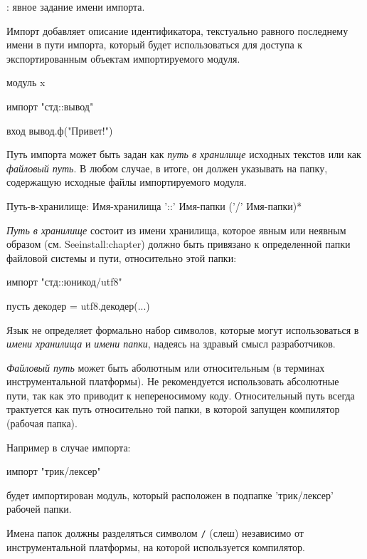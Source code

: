 \TBD: явное задание имени импорта.

\bigskip
Импорт добавляет описание идентификатора, текстуально равного последнему имени в пути импорта, который будет использоваться для доступа к экспортированным объектам импортируемого модуля. 

\begin{Trivil}
модуль x

импорт "стд::вывод"

вход {
    вывод.ф("Привет!")
}
\end{Trivil}

Путь импорта может быть задан как \emph{путь в хранилище} исходных текстов или как \emph{файловый путь}. 
В любом случае, в итоге, он должен указывать на папку, содержащую исходные файлы импортируемого модуля.

\begin{Grammar}[vspace=2pt]
Путь-в-хранилище: 
    Имя-хранилища '::' Имя-папки ('/' Имя-папки)*
\end{Grammar} 

\emph{Путь в хранилище} состоит из имени хранилища, которое явным или неявным образом (см. See{install:chapter}) должно быть привязано к определенной папки файловой системы и пути, относительно этой папки:
\begin{Trivil}[vspace=2pt]
импорт "стд::юникод/utf8" 

пусть декодер = utf8.декодер(...)
\end{Trivil}

Язык не определяет формально набор символов, которые могут использоваться в  \emph{имени хранилища} и  \emph{имени папки}, надеясь на здравый смысл разработчиков.

\emph{Файловый путь} может быть аболютным или относительным (в терминах инструментальной платформы). 
Не рекомендуется использовать абсолютные пути, так как это приводит к непереносимому коду. 
Относительный путь всегда трактуется как путь относительно той папки, в которой запущен компилятор (рабочая папка). 

Например в случае импорта:
\begin{Trivil}[vspace=2pt]
импорт "трик/лексер"
\end{Trivil}
будет импортирован модуль, который расположен в подпапке 'трик/лексер' рабочей папки.

Имена папок должны разделяться символом \verb+/+ (слеш) независимо от инструментальной платформы, на которой используется компилятор.


